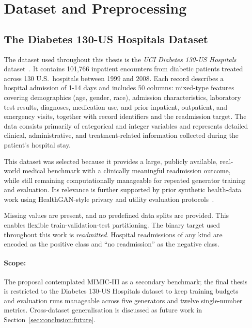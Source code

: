 
\section{Dataset and Preprocessing}
\label{sec:method:data}

\subsection{The Diabetes 130-US Hospitals Dataset}
\label{sec:data:dataset}

The dataset used throughout this thesis is the \emph{UCI Diabetes 130-US
Hospitals} dataset~\cite{diabetes_db,strack2014impact}. It contains 101{,}766
inpatient encounters from diabetic patients treated across 130 U.S.\ hospitals
between 1999 and 2008. Each record describes a hospital admission of 1-14
days and includes 50 columns: mixed-type features covering demographics (age,
gender, race), admission characteristics, laboratory test results, diagnoses,
medication use, and prior inpatient, outpatient, and emergency visits,
together with record identifiers and the readmission target. The
data consists primarily of categorical and integer variables and represents
detailed clinical, administrative, and treatment-related information collected
during the patient's hospital stay. 

This dataset was selected because it provides a large, publicly available,
real-world medical benchmark with a clinically meaningful readmission outcome,
while still remaining computationally manageable for repeated generator
training and evaluation. Its relevance is further supported by prior synthetic
health-data work using HealthGAN-style privacy and utility evaluation
protocols~\cite{healthgan}.

Missing values are present, and no
predefined data splits are provided. This enables flexible
train-validation-test partitioning. The binary target used throughout this
work is \emph{readmitted}. Hospital readmissions of any kind are encoded as
the positive class and ``no readmission'' as the negative class.

\paragraph{Scope:} The proposal contemplated MIMIC-III as a secondary
benchmark; the final thesis is restricted to the Diabetes 130-US Hospitals
dataset to keep training budgets and evaluation runs manageable across five
generators and twelve single-number metrics. Cross-dataset generalisation is discussed as
future work in Section~\ref{sec:conclusion:future}.

